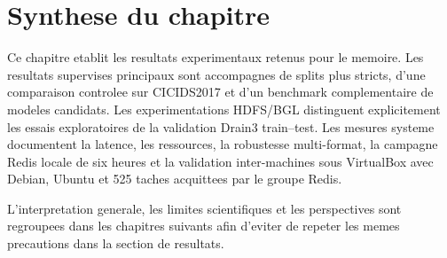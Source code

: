 \section{Synthese du chapitre}
Ce chapitre etablit les resultats experimentaux retenus pour le memoire. Les resultats supervises principaux sont accompagnes de splits plus stricts, d'une comparaison controlee sur CICIDS2017 et d'un benchmark complementaire de modeles candidats. Les experimentations HDFS/BGL distinguent explicitement les essais exploratoires de la validation Drain3 train--test. Les mesures systeme documentent la latence, les ressources, la robustesse multi-format, la campagne Redis locale de six heures et la validation inter-machines sous VirtualBox avec Debian, Ubuntu et 525 taches acquittees par le groupe Redis.

L'interpretation generale, les limites scientifiques et les perspectives sont regroupees dans les chapitres suivants afin d'eviter de repeter les memes precautions dans la section de resultats.
